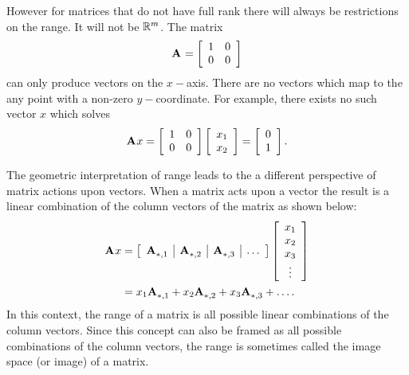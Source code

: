 However for matrices that do not have full rank there will always be restrictions on the range. It will not be $\real{m}$. The matrix
\begin{equation}
  \A{}=\mat{cc}{1&0\\0&0}
\end{equation}
can only produce vectors on the $x-$axis. There are no vectors which map to the any point with a non-zero $y-$coordinate. For example, there exists no such vector $x$ which solves 
\begin{equation}
  \A{}x=\mat{cc}{1&0\\0&0}\mat{c}{x_{1}\\x_{2}} = \mat{c}{0\\1}.
\end{equation}

The geometric interpretation of range leads to the a different perspective of matrix actions upon vectors. When a matrix acts upon a vector the result is a linear combination of the column vectors of the matrix as shown below:
\begin{equation}
\begin{split}
  \A{}x&=\mat{c|c|c|c}{\A{}_{*,1} & \A{}_{*,2} & \A{}_{*,3} & \hdots}\mat{c}{x_{1} \\ x_{2} \\ x_{3} \\ \vdots} \\
    &= x_{1} \A{}_{*,1} + x_{2} \A{}_{*,2} + x_{3} \A{}_{*,3} + \dots .
\end{split}
\end{equation}
In this context, the range of a matrix is all possible linear combinations of the column vectors. Since this concept can also be framed as all possible combinations of the column vectors, the range is sometimes called the image space (or image) of a matrix.

